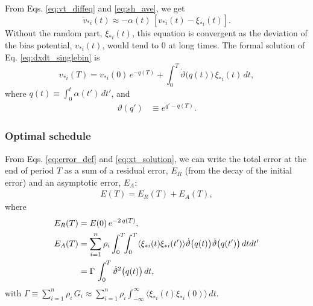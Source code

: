 \documentclass[reprint, superscriptaddress, floatfix]{revtex4-1}
\newcommand{\Err}{E}
\begin{document}
From Eqs.
\eqref{eq:vt_diffeq} and \eqref{eq:sh_ave},
we get %
%
\begin{equation}
  \dot v_{*i}(t)
  \approx
  -\alpha(t) \, \left[ v_{*i}(t) - \xi_{*i}(t) \right]
  .
  \label{eq:dxdt_singlebin}
\end{equation}
%
Without the random part, $\xi_{*i}(t)$,
this equation is convergent
as the deviation of the bias potential, $v_{*i}(t)$,
would tend to $0$ at long times.
%
The formal solution of Eq. \eqref{eq:dxdt_singlebin} is
%
\begin{equation}
  v_{*i}(T)
  =
  v_{*i}(0) \, e^{-q(T)}
  +
  \int_0^T
    \dot{\vartheta}\bigl( q(t) \bigr) \, \xi_{*i}(t) \, dt,
  \label{eq:xt_solution}
\end{equation}
%
where
%
$q(t) \equiv \int_0^t \alpha(t') \, dt'$,
%
and
%
\begin{align}
  \vartheta(q')
  &\equiv
  e^{q' - q(T)}.
  \label{eq:theta_def}
\end{align}



\subsubsection{Optimal schedule}



From Eqs. \eqref{eq:error_def} and \eqref{eq:xt_solution},
we can write the total error at the end of period $T$
as a sum of a residual error, $E_R$ (from the decay of the initial error)
and an asymptotic error, $E_A$:
%
\begin{align}
  \Err(T)
  =
  \Err_R(T) + \Err_A(T)
  ,
  \label{eq:error_tot}
\end{align}
%
where
\begin{align}
  \Err_R(T)
  &= \Err(0) \, e^{-2 \, q(T)}
  ,
  \label{eq:ER_sbin}
  \\
  \Err_A(T)
  &=
  \sum_{i=1}^n \rho_i
    \int_0^T\!\!\int_0^T
    \langle
      \xi_{*i}(t) \xi_{*i}(t')
    \rangle
    \dot \vartheta\bigl( q(t) \bigr)
    \dot \vartheta\bigl( q(t') \bigr)
    \, dt dt'
  \notag \\
  &= \Gamma \, \int_0^T \dot \vartheta^2\bigl( q(t) \bigr) \, dt
  ,
  \label{eq:EA_sbin}
\end{align}
with
$\Gamma \equiv \sum_{i=1}^n \rho_i \, G_i
\approx \sum_{i=1}^n \rho_i \int_{-\infty}^{\infty} \langle \xi_{*i}(t) \xi_{*i}(0) \rangle \, dt$.
\end{document}
